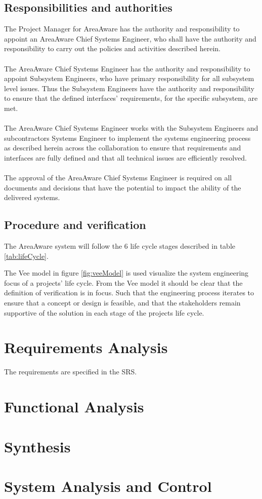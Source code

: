 \subsection{Responsibilities and authorities}
The Project Manager for AreaAware has the authority and responsibility to appoint an AreaAware Chief Systems Engineer, who shall have the authority and responsibility to carry out the policies and activities described herein.\\\\
The AreaAware Chief Systems Engineer has the authority and responsibility to appoint Subsystem Engineers, who have primary responsibility for all subsystem level issues.
Thus the Subsystem Engineers have the authority and responsibility to ensure that the defined interfaces' requirements, for the specific subsystem, are met.\\\\
The AreaAware Chief Systems Engineer works with the Subsystem Engineers and subcontractors Systems Engineer to implement the systems engineering process as described herein across the collaboration to ensure that requirements and interfaces are fully defined and that all technical issues are efficiently resolved.\\\\
The approval of the AreaAware Chief Systems Engineer is required on all documents and decisions that have the potential to impact the ability of the delivered systems.

\subsection{Procedure and verification}
The AreaAware system will follow the 6 life cycle stages described in table \ref{tab:lifeCycle}.


The Vee model in figure \ref{fig:veeModel} is used visualize the system engineering focus of a projects' life cycle.
From the Vee model it should be clear that the definition of verification is in focus.
Such that the engineering process iterates to ensure that a concept or design is feasible, and that the stakeholders remain supportive of the solution in each stage of the projects life cycle.


\section{Requirements Analysis}
The requirements are specified in the SRS.


\section{Functional Analysis}


\section{Synthesis}


\section {System Analysis and Control}
